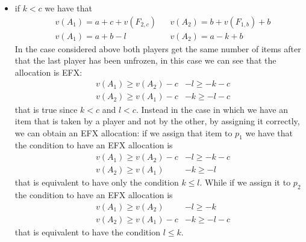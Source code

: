 \begin{itemize}
    \item if $k < c$ we have that
    \begin{align*}
        &v(A_1) = a + c + v(F_{2,c}) && v(A_2) = b + v(F_{1,b}) + b\\
        &v(A_1) = a + b-l && v(A_2) = a - k + b
    \end{align*}
    In the case considered above both players get the same number of items after that the last player has been unfrozen, in this case we can see that the allocation is EFX: 
    \begin{align*}
        &v(A_1) \ge v(A_2) -c & -l \ge - k - c\\
        &v(A_2) \ge v(A_1) -c & -k \ge -l -c
    \end{align*}
    that is true since $k<c$ and $l<c$.
    Instead in the case in which we have an item that is taken by a player and not by the other, by assigning it correctly, we can obtain an EFX allocation: if we assign that item to $p_1$ we have that the condition to have an EFX allocation is
    \begin{align*}
        &v(A_1) \ge v(A_2) -c & -l \ge - k - c\\
        &v(A_2) \ge v(A_1) & -k \ge -l 
    \end{align*}
    that is equivalent to have only the condition $k\le l$.
    While if we assign it to $p_2$ the condition to have an EFX allocation is
    \begin{align*}
        &v(A_1) \ge v(A_2) & -l \ge - k\\
        &v(A_2) \ge v(A_1)-c & -k \ge -l -c
    \end{align*}
    that is equivalent to have the condition $l\le k$.
    

\end{itemize}
